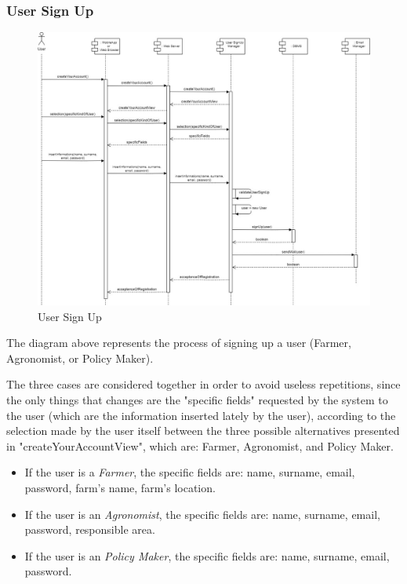 \documentclass{article}
\begin{document}
    \subsubsection{User Sign Up}
        \begin{figure} [h]
            \centering
            \includegraphics[width=1\textwidth]{images/ArchitecturalDesign/RuntimeView/1. UserSignUp.jpg}
            \caption{\label{fig:userSignUp}User Sign Up}
        \end{figure}
        
        The diagram above represents the process of signing up a user (Farmer, Agronomist, or Policy Maker). \par 
        The three cases are considered together in order to avoid useless repetitions, since the only things that changes are the "specific fields" requested by the system to the user (which are the information inserted lately by the user), according to the selection made by the user itself between the three possible alternatives presented in "createYourAccountView", which are: Farmer, Agronomist, and Policy Maker. \par
        
        \begin{itemize}
            \item If the user is a \textit{Farmer}, the specific fields are: name, surname, email, password, farm's name, farm's location.
            \item If the user is an \textit{Agronomist}, the specific fields are: name, surname, email, password, responsible area. 
            \item If the user is an \textit{Policy Maker}, the specific fields are: name, surname, email, password.
        \end{itemize}
\end{document}
